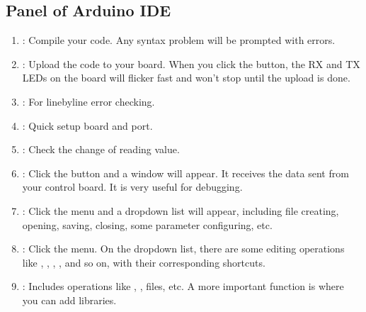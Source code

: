 \documentclass[a4paper,11pt,english]{sphinxmanual}
\begin{document}
\subsection{Panel of Arduino IDE}
\label{\detokenize{Get_Started_with_Arduino/Creating_Opening_Saving_Sketches:panel-of-arduino-ide}}
\noindent{}
\begin{enumerate}
%
\item {} 
\sphinxAtStartPar
{}: Compile your code. Any syntax problem will be prompted with errors.

\item {} 
\sphinxAtStartPar
{}: Upload the code to your board. When you click the button, the RX and TX LEDs on the board will flicker fast and won’t stop until the upload is done.

\item {} 
\sphinxAtStartPar
{}: For line\sphinxhyphen{}by\sphinxhyphen{}line error checking.

\item {} 
\sphinxAtStartPar
{}: Quick setup board and port.

\item {} 
\sphinxAtStartPar
{}: Check the change of reading value.

\item {} 
\sphinxAtStartPar
{}: Click the button and a window will appear. It receives the data sent from your control board. It is very useful for debugging.

\item {} 
\sphinxAtStartPar
{}: Click the menu and a drop\sphinxhyphen{}down list will appear, including file creating, opening, saving, closing, some parameter configuring, etc.

\item {} 
\sphinxAtStartPar
{}: Click the menu. On the drop\sphinxhyphen{}down list, there are some editing operations like , , , , and so on, with their corresponding shortcuts.

\item {} 
\sphinxAtStartPar
{}: Includes operations like , ,  files, etc. A more important function is  \textendash{} where you can add libraries.


\end{enumerate}
\end{document}
